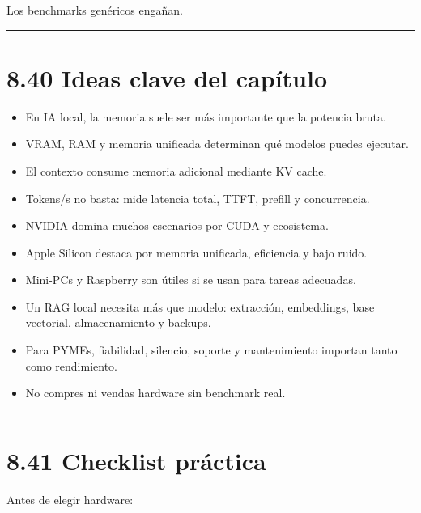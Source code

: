 Los benchmarks genéricos engañan.

\begin{center}\rule{0.5\linewidth}{0.5pt}\end{center}

\section{8.40 Ideas clave del
capítulo}\label{ideas-clave-del-capuxedtulo-7}

\begin{itemize}
\tightlist
\item
  En IA local, la memoria suele ser más importante que la potencia
  bruta.
\item
  VRAM, RAM y memoria unificada determinan qué modelos puedes ejecutar.
\item
  El contexto consume memoria adicional mediante KV cache.
\item
  Tokens/s no basta: mide latencia total, TTFT, prefill y concurrencia.
\item
  NVIDIA domina muchos escenarios por CUDA y ecosistema.
\item
  Apple Silicon destaca por memoria unificada, eficiencia y bajo ruido.
\item
  Mini-PCs y Raspberry son útiles si se usan para tareas adecuadas.
\item
  Un RAG local necesita más que modelo: extracción, embeddings, base
  vectorial, almacenamiento y backups.
\item
  Para PYMEs, fiabilidad, silencio, soporte y mantenimiento importan
  tanto como rendimiento.
\item
  No compres ni vendas hardware sin benchmark real.
\end{itemize}

\begin{center}\rule{0.5\linewidth}{0.5pt}\end{center}

\section{8.41 Checklist práctica}\label{checklist-pruxe1ctica-7}

Antes de elegir hardware:

